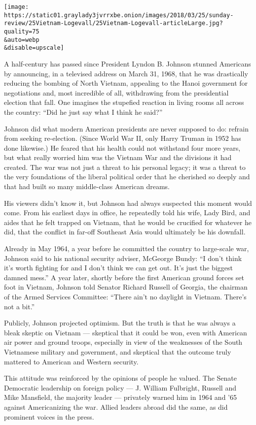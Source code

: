 \texttt{[image: https://static01.graylady3jvrrxbe.onion/images/2018/03/25/sunday-review/25Vietnam-Logevall/25Vietnam-Logevall-articleLarge.jpg?quality=75\\\&auto=webp\\\&disable=upscale]}

A half-century has passed since President Lyndon B. Johnson stunned
Americans by announcing, in a televised address on March 31, 1968, that
he was drastically reducing the bombing of North Vietnam, appealing to
the Hanoi government for negotiations and, most incredible of all,
withdrawing from the presidential election that fall. One imagines the
stupefied reaction in living rooms all across the country: ``Did he just
say what I think he said?''

Johnson did what modern American presidents are never supposed to do:
refrain from seeking re-election. (Since World War II, only Harry Truman
in 1952 has done likewise.) He feared that his health could not
withstand four more years, but what really worried him was the Vietnam
War and the divisions it had created. The war was not just a threat to
his personal legacy; it was a threat to the very foundations of the
liberal political order that he cherished so deeply and that had built
so many middle-class American dreams.

His viewers didn't know it, but Johnson had always suspected this moment
would come. From his earliest days in office, he repeatedly told his
wife, Lady Bird, and aides that he felt trapped on Vietnam, that he
would be crucified for whatever he did, that the conflict in far-off
Southeast Asia would ultimately be his downfall.

Already in May 1964, a year before he committed the country to
large-scale war, Johnson said to his national security adviser, McGeorge
Bundy: ``I don't think it's worth fighting for and I don't think we can
get out. It's just the biggest damned mess.'' A year later, shortly
before the first American ground forces set foot in Vietnam, Johnson
told Senator Richard Russell of Georgia, the chairman of the Armed
Services Committee: ``There ain't no daylight in Vietnam. There's not a
bit.''

Publicly, Johnson projected optimism. But the truth is that he was
always a bleak skeptic on Vietnam --- skeptical that it could be won,
even with American air power and ground troops, especially in view of
the weaknesses of the South Vietnamese military and government, and
skeptical that the outcome truly mattered to American and Western
security.

This attitude was reinforced by the opinions of people he valued. The
Senate Democratic leadership on foreign policy --- J. William Fulbright,
Russell and Mike Mansfield, the majority leader --- privately warned him
in 1964 and '65 against Americanizing the war. Allied leaders abroad did
the same, as did prominent voices in the press.

